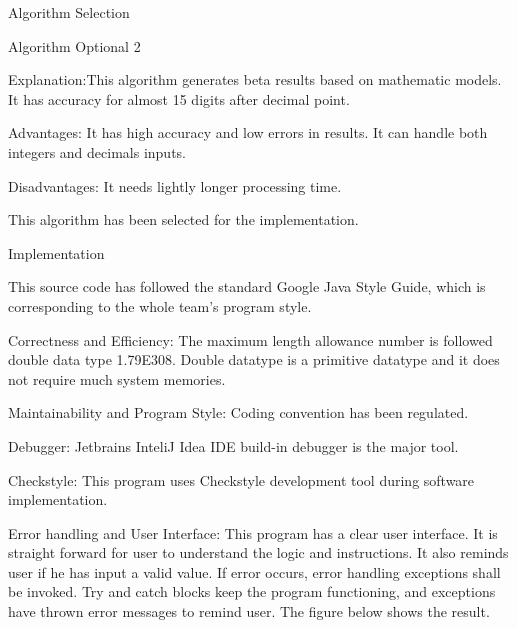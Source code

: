 \documentclass[final]{beamer}
\newlength{\onecolwid}
\newlength{\twocolwid}
\begin{document}
\begin{frame}
\begin{columns}[t]
\begin{column}{\twocolwid}
\begin{columns}[t,totalwidth=\twocolwid]
\begin{column}{\onecolwid}
\begin{exampleblock}{ Algorithm Selection}
\begin{itemize}
{}
         \end{itemize}    
Algorithm Optional 2
                \begin{itemize}
           {\small     \item Explanation:This algorithm generates beta results based on mathematic models. It has accuracy for almost 15 digits after decimal point. 
                \item Advantages: It has high accuracy and low errors in results. It can handle both integers and decimals inputs.  \\
\item Disadvantages:  It needs lightly longer processing time.
\item This algorithm has been selected for the implementation.

}


              
                   \end{itemize}
              
              
                
                

                
\end{exampleblock}

\begin{exampleblock}{ {Implementation}}
\begin{itemize}
           {\small        
           \item  This source code has followed the standard Google Java Style Guide, which
is corresponding to the whole team's program style.  
                \item Correctness and Efficiency: The maximum length
allowance number is followed double data type 1.79E308. Double datatype is a primitive datatype and it
does not require much system memories. 
               \item Maintainability and Program Style: Coding convention has been regulated. 

\item Debugger: Jetbrains InteliJ Idea IDE build-in debugger is the major tool.
\item Checkstyle: This program uses Checkstyle development tool during software implementation.

\item Error handling and User Interface: This program has a clear user interface. It is straight forward for user to understand the logic and instructions. It also reminds user if
he has input a valid value. If error occurs, error handling exceptions shall be
invoked. Try and catch blocks keep the program functioning, and exceptions
have thrown error messages to remind user. The figure below shows the result.
 
}
\end{itemize}
\end{exampleblock}
\end{column}
\end{columns}
\end{column}
\end{columns}
\end{frame}
\end{document}
